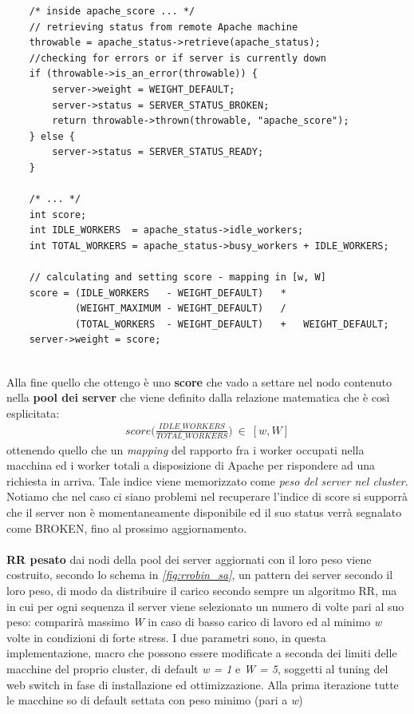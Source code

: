 \documentclass[italian]{tktltiki2}
\begin{document}
\begin{lstlisting}
    /* inside apache_score ... */
    // retrieving status from remote Apache machine
    throwable = apache_status->retrieve(apache_status);   
    //checking for errors or if server is currently down
    if (throwable->is_an_error(throwable)) {
        server->weight = WEIGHT_DEFAULT;
        server->status = SERVER_STATUS_BROKEN;
        return throwable->thrown(throwable, "apache_score");
    } else {
        server->status = SERVER_STATUS_READY;
    }
    
    /* ... */
    int score;
    int IDLE_WORKERS  = apache_status->idle_workers;
    int TOTAL_WORKERS = apache_status->busy_workers + IDLE_WORKERS;

    // calculating and setting score - mapping in [w, W]
    score = (IDLE_WORKERS   - WEIGHT_DEFAULT)   *
            (WEIGHT_MAXIMUM - WEIGHT_DEFAULT)   /
            (TOTAL_WORKERS  - WEIGHT_DEFAULT)   +   WEIGHT_DEFAULT;
    server->weight = score;
       
\end{lstlisting}
Alla fine quello che ottengo è uno \textbf{score} che vado a settare nel nodo contenuto nella \textbf{pool dei server} che viene definito dalla relazione matematica che è così esplicitata:
\begin{align*}
	score\Big(\frac{IDLE\_WORKERS}{TOTAL\_WORKERS}\Big) ~ \in ~ [w, W]
\end{align*}
ottenendo quello che un \emph{mapping} del rapporto fra i worker occupati nella macchina ed i worker totali a disposizione di Apache per rispondere ad una richiesta in arriva. Tale indice viene memorizzato come \emph{peso del server nel cluster}.\\
Notiamo che nel caso ci siano problemi nel recuperare l'indice di score si supporrà che il server non è momentaneamente disponibile ed il suo status verrà segnalato come BROKEN, fino al prossimo aggiornamento.\\\\
\textbf{RR pesato} dai nodi della pool dei server aggiornati con il loro peso viene costruito, secondo lo schema in \emph{\ref{fig:rrobin_sa}}, un pattern dei server secondo il loro peso, di modo da distribuire il carico secondo sempre un algoritmo RR, ma in cui per ogni sequenza il server viene selezionato un numero di volte pari al suo peso: comparirà massimo \emph{W} in caso di basso carico di lavoro ed al minimo \emph{w} volte in condizioni di forte stress. I due parametri sono, in questa implementazione, macro che possono essere modificate a seconda dei limiti delle macchine del proprio cluster, di default \emph{w = 1} e \emph{W = 5}, soggetti al tuning del web switch in fase di installazione ed ottimizzazione. Alla prima iterazione tutte le macchine so di default settata con peso minimo (pari a \emph{w})\\\\ 
\end{document}
